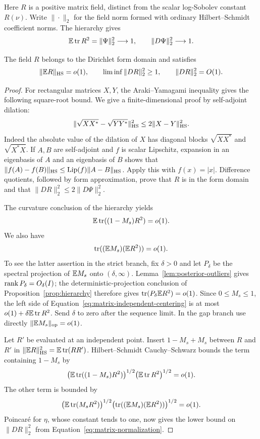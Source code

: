 Here $R$ is a positive matrix field, distinct from the scalar log-Sobolev
constant $R(\nu)$.  Write $\|\cdot\|_2$ for the field norm formed with
ordinary Hilbert--Schmidt coefficient norms.  The hierarchy gives
\begin{equation}\label{eq:matrix-normalization}
 \mathbb E\operatorname{tr} R^2=\|\Psi\|_2^2\longrightarrow1,
 \qquad \|D\Psi\|_2^2\longrightarrow1.
\end{equation}

\begin{lemma}\label{lem:matrix-centering}
The field $R$ belongs to the Dirichlet form domain and satisfies
\[
 \|\mathbb E R\|_{\mathrm{HS}}=o(1),\qquad
 \liminf\|DR\|_2^2\ge1,\qquad \|DR\|_2^2=O(1).
\]
\end{lemma}
\begin{proof}
For rectangular matrices $X,Y$, the Araki--Yamagami inequality
\cite[Theorem~1]{ArakiYamagami1981} gives the following square-root bound.
We give a finite-dimensional proof by self-adjoint dilation:
\begin{equation}\label{eq:matrix-root-lipschitz}
 \|\sqrt{XX^*}-\sqrt{YY^*}\|_{\mathrm{HS}}^2
 \le 2\|X-Y\|_{\mathrm{HS}}^2.
\end{equation}
Indeed the absolute value of the dilation of $X$ has diagonal blocks
$\sqrt{XX^*}$ and $\sqrt{X^*X}$.  If $A,B$ are self-adjoint and $f$ is
scalar Lipschitz, expansion in an eigenbasis of $A$ and an eigenbasis of $B$
shows that
$\|f(A)-f(B)\|_{\mathrm{HS}}\le\operatorname{Lip}(f)\|A-B\|_{\mathrm{HS}}$.
Apply this with $f(x)=|x|$.  Difference quotients, followed by form
approximation, prove that $R$ is in the form domain and that
$\|DR\|_2^2\le2\|D\Psi\|_2^2$.

The curvature conclusion of the hierarchy yields
\[
 \mathbb E\operatorname{tr}((1-M_s)R^2)=o(1).
\]
We also have
\begin{equation}\label{eq:matrix-independent-centering}
 \operatorname{tr}((\mathbb E M_s)(\mathbb E R^2))=o(1).
\end{equation}
To see the latter assertion in the strict branch, fix $\delta>0$ and let
$P_\delta$ be the spectral projection of $\mathbb E M_s$ onto $(\delta,\infty)$.
Lemma~\ref{lem:posterior-outliers} gives
$\operatorname{rank} P_\delta=O_\delta(I)$; the deterministic-projection conclusion of
Proposition~\ref{prop:hierarchy} therefore gives
$\operatorname{tr}(P_\delta\mathbb E R^2)=o(1)$.  Since $0\le M_s\le1$, the left side of
Equation~\eqref{eq:matrix-independent-centering} is at most
$o(1)+\delta\mathbb E\operatorname{tr} R^2$.  Send $\delta$ to zero after the sequence limit.
In the gap branch use directly $\|\mathbb E M_s\|_{\mathrm{op}}=o(1)$.

Let $R'$ be evaluated at an independent point.  Insert $1-M_s+M_s$
between $R$ and $R'$ in
$\|\mathbb E R\|_{\mathrm{HS}}^2=\mathbb E\operatorname{tr}(RR')$.
Hilbert--Schmidt Cauchy--Schwarz bounds the term containing $1-M_s$ by
\[
 \bigl(\mathbb E\operatorname{tr}((1-M_s)R^2)\bigr)^{1/2}
 \bigl(\mathbb E\operatorname{tr} R^2\bigr)^{1/2}=o(1).
\]
The other term is bounded by
\[
 \bigl(\mathbb E\operatorname{tr}(M_sR^2)\bigr)^{1/2}
 \bigl(\operatorname{tr}((\mathbb E M_s)(\mathbb E R^2))\bigr)^{1/2}=o(1).
\]
Poincar\'e for $\eta$, whose constant tends to one, now gives the lower
bound on $\|DR\|_2^2$ from Equation~\eqref{eq:matrix-normalization}.
\end{proof}

